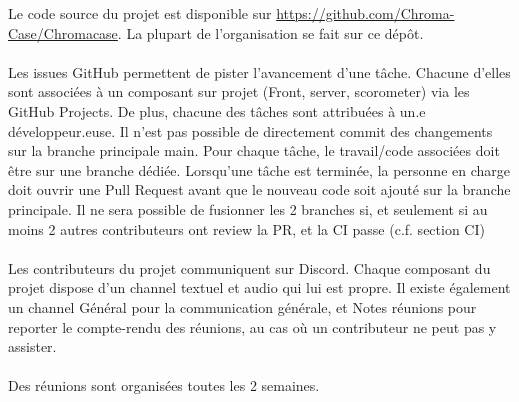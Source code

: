 Le code source du projet est disponible sur \href{https://github.com/Chroma-Case/Chromacase}{https://github.com/Chroma-Case/Chromacase}.
La plupart de l’organisation se fait sur ce dépôt.
\\\\
Les issues GitHub permettent de pister l’avancement d’une tâche. Chacune d’elles sont associées à un composant sur projet (Front, server, scorometer) via les GitHub Projects. De plus, chacune des tâches sont attribuées à un.e développeur.euse.
Il n’est pas possible de directement commit des changements sur la branche principale main. Pour chaque tâche, le travail/code associées doit être sur une branche dédiée.
Lorsqu’une tâche est terminée, la personne en charge doit ouvrir une Pull Request avant que le nouveau code soit ajouté sur la branche principale. Il ne sera possible de fusionner les 2 branches si, et seulement si au moins 2 autres contributeurs ont review la PR, et la CI passe (c.f. section CI)
\\\\
Les contributeurs du projet communiquent sur Discord. Chaque composant du projet dispose d’un channel textuel et audio qui lui est propre. Il existe également un channel Général pour la communication générale, et Notes réunions pour reporter le compte-rendu des réunions, au cas où un contributeur ne peut pas y assister.
\\\\
Des réunions sont organisées toutes les 2 semaines.
